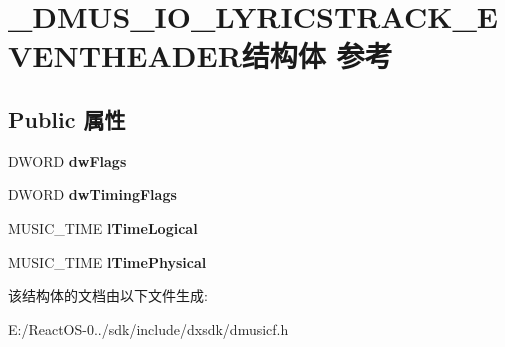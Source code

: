 \hypertarget{struct___d_m_u_s___i_o___l_y_r_i_c_s_t_r_a_c_k___e_v_e_n_t_h_e_a_d_e_r}{}\section{\+\_\+\+D\+M\+U\+S\+\_\+\+I\+O\+\_\+\+L\+Y\+R\+I\+C\+S\+T\+R\+A\+C\+K\+\_\+\+E\+V\+E\+N\+T\+H\+E\+A\+D\+E\+R结构体 参考}
\label{struct___d_m_u_s___i_o___l_y_r_i_c_s_t_r_a_c_k___e_v_e_n_t_h_e_a_d_e_r}
\subsection*{Public 属性}
\begin{DoxyCompactItemize}
\item 
\mbox{\label{struct___d_m_u_s___i_o___l_y_r_i_c_s_t_r_a_c_k___e_v_e_n_t_h_e_a_d_e_r_aa9e33db5941f9801ece86f08209e1e80}} 
D\+W\+O\+RD {\bfseries dw\+Flags}
\item 
\mbox{\label{struct___d_m_u_s___i_o___l_y_r_i_c_s_t_r_a_c_k___e_v_e_n_t_h_e_a_d_e_r_a99855a91300185aa7231d4b59927f3b4}} 
D\+W\+O\+RD {\bfseries dw\+Timing\+Flags}
\item 
\mbox{\label{struct___d_m_u_s___i_o___l_y_r_i_c_s_t_r_a_c_k___e_v_e_n_t_h_e_a_d_e_r_a5b8f92c90d842c82149f64fadb4569a8}} 
M\+U\+S\+I\+C\+\_\+\+T\+I\+ME {\bfseries l\+Time\+Logical}
\item 
\mbox{\label{struct___d_m_u_s___i_o___l_y_r_i_c_s_t_r_a_c_k___e_v_e_n_t_h_e_a_d_e_r_adcfb36cbcaaae800510472141a1eea82}} 
M\+U\+S\+I\+C\+\_\+\+T\+I\+ME {\bfseries l\+Time\+Physical}
\end{DoxyCompactItemize}


该结构体的文档由以下文件生成\+:\begin{DoxyCompactItemize}
\item 
E\+:/\+React\+O\+S-\/0../sdk/include/dxsdk/dmusicf.\+h\end{DoxyCompactItemize}
